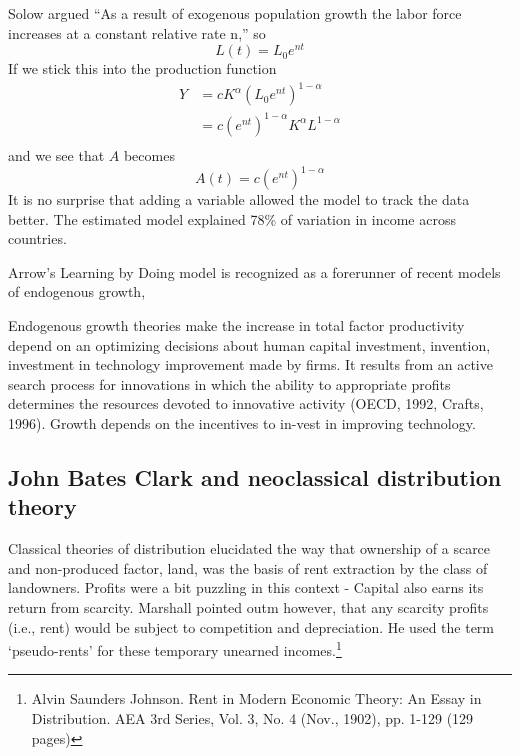 Solow argued ``As a result of exogenous population growth the labor force increases at a constant relative rate n,'' so
  \[L(t)= L_0e^{nt}\] 
If we stick this into the production function 
 \begin{eqnarray}
 Y&=cK^\alpha (L_0e^{nt})^{1-\alpha}\\
    &=c(e^{nt})^{1-\alpha}K^\alpha L^{1-\alpha}\\
 \end{eqnarray}
and we see that $A$ becomes
 \[A(t)=c(e^{nt})^{1-\alpha}\]
It is no surprise that adding a variable allowed the model to track the data better. The estimated model explained 78\% of variation in income across countries.%

Arrow's Learning by Doing model is recognized as a forerunner of recent models of endogenous growth, 
 
 
Endogenous growth theories make the increase in total factor productivity depend on an optimizing decisions about human capital investment, invention, investment in technology improvement made by firms.  It results from an active search process for innovations in which the ability to appropriate profits determines the resources devoted to innovative activity (OECD, 1992, Crafts, 1996). Growth depends on the incentives to in-vest in improving technology.%
 


  \subsection{John Bates Clark and neoclassical distribution theory}
  Classical theories of distribution elucidated the way that ownership of a scarce and non-produced factor, land, was the  basis of rent extraction by the class of landowners. Profits were a bit puzzling in this context - Capital also earns its return from scarcity. Marshall pointed outm however, that any scarcity profits (i.e., rent) would be subject to competition and depreciation.  He used the term `pseudo-rents' for these temporary  unearned incomes.\footnote{Alvin Saunders Johnson. Rent in Modern Economic Theory: An Essay in Distribution. AEA 3rd Series, Vol. 3, No. 4 (Nov., 1902), pp. 1-129 (129 pages)}

